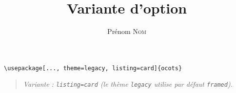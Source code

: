 \documentclass[11pt]{ocots-book}
\title{Variante d'option}
\author{Prénom \textsc{Nom}}
\newcommand{\ocotsvariantnote}[1]{\begin{quote}\itshape Variante : #1\end{quote}}
\begin{document}
\maketitle

\begin{lstlisting}
\usepackage[..., theme=legacy, listing=card]{ocots}
\end{lstlisting}
\ocotsvariantnote{\texttt{listing=card} (le th\`eme \texttt{legacy} utilise par d\'efaut \texttt{framed}).}

\end{document}
